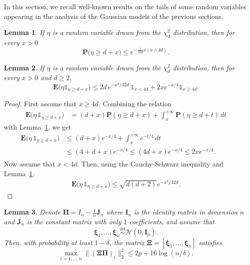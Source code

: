 \documentclass[sts,preprint,reqno,a4paper]{imsart}
\def\d{\delta}
\def\bxi{\boldsymbol\xi}
\def\bXi{\boldsymbol\Xi}
\def\bfI{\mathbf I}
\def\bfJ{\mathbf J}
\def\bfPi{\mathbf\Pi}
\def\fcar{\mathds{1}}
\def\pinf{{+\infty}}
\def\esp{\mathbf E}
\def\prob{\mathbf P}
\def\simiid{\overset{\text{iid}}{\sim}}
\theoremstyle{plain}
\newtheorem{lemma}{Lemma}
\theoremstyle{remark}
\theoremstyle{definition}
\begin{document}
In this section, we recall  well-known results on the tails of
some random variables appearing in the analysis of the Gaussian models
of the previous sections.


\begin{lemma}\label{lemme_chideux}
	If $\eta$ is a random variable drawn from the $\chi^2_d$ distribution, then for every $x>0$
	\begin{equation}
		\prob\big(\eta \ge d+ x\big) \le e^{-\frac1{16d} x (x\wedge 4d)} .
	\end{equation}
\end{lemma}

\begin{lemma}\label{lemme_esperancechideux}
	If $\eta$ is a random variable drawn from the $\chi^2_d$ distribution, then for every $x>0$ and $d\ge 2$,
	\begin{equation}
	\esp\big(\eta \fcar_{\eta\ge d+x}\big) \le 2d\,e^{-x^2/32d} \,\fcar_{x< 4d} +
	2xe^{-x/4} \fcar_{x\ge 4d}.
	\end{equation}	
\end{lemma}

\begin{proof}
	First assume that $x\ge 4d$. Combining the relation
	\begin{align}
		\esp\big(\eta\, \fcar_{\eta\ge d+x}\big) &= (d+x)\prob(\eta\ge d+x)+\int_x^\pinf \prob(\eta\ge d+t)\,dt
	\end{align}
	with Lemma~\ref{lemme_chideux}, we get
	\begin{align}
		\esp\big(\eta\, \fcar_{\eta\ge d+x}\big)
		&\le (d+x) e^{-x/4} + \int_x^\pinf e^{-t/4}\, dt\\
		&\le (4+d+x)e^{-x/4}\le (4d+x)e^{-x/4}\le 2xe^{-x/4}. \phantom{\int_0^\pinf}
	\end{align}
	Now assume that $x<4d$. Then, using the Cauchy-Schwarz inequality and
	Lemma~\ref{lemme_chideux},
	\begin{align}
	\esp\big(\eta\, \fcar_{\eta\ge d+x}\big) \le \sqrt{d(d+2)} e^{-x^2/32d}.
	\end{align}
\end{proof}

\begin{lemma}\label{lemme_probabiliteA}
	Denote $\bfPi=I_n-\frac1n \bfJ_n$  where $\bfI_n$ is the identity matrix in dimension $n$ and $\bfJ_n$ is the constant matrix with only $1$ coefficients, and assume that
	\begin{equation}
		\bxi_1,\ldots,\bxi_n \simiid \mathcal{N}(0,\bfI_p).
	\end{equation}
	Then, with probability at least $1-\d$, the matrix $\bXi = [\bxi_1,\ldots,\bxi_n]$ 
	satisfies
	\begin{equation}
		\max_{i=1,\ldots,n}  \big\|(\bXi\bfPi)_i\big\|_2^2 \le 2p+16\log(n/\delta).
	\end{equation}
\end{lemma}
\end{document}
